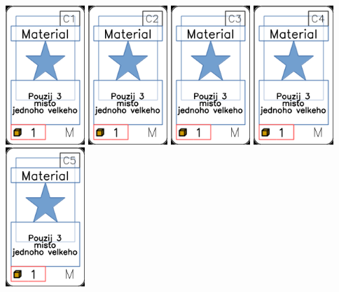 \documentclass[a4paper]{article}
\begin{document}
	\includegraphics[width=3.0cm]{img-1_40}
	\includegraphics[width=3.0cm]{img-1_41}
	\includegraphics[width=3.0cm]{img-1_42}
	\includegraphics[width=3.0cm]{img-1_43}
	\includegraphics[width=3.0cm]{img-1_44}
\end{document}

